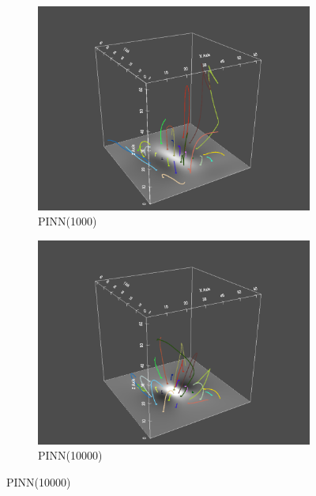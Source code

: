 \begin{figure}
  \begin{subfigure}{.5\linewidth}
    \centering
    \caption{PINN(1000)}
    \includegraphics[trim={6cm 0cm 6cm 3cm}, clip, width=\linewidth]{"img/PINN_001000_xz_tilted.pdf"}
  \end{subfigure}%
  \begin{subfigure}{.5\linewidth}
    \centering
    \caption{PINN(10000)}
    \includegraphics[trim={6cm 0cm 6cm 3cm}, clip, width=\linewidth]{"img/PINN_010000_xz_tilted.pdf"}
  \end{subfigure}


\end{figure}
